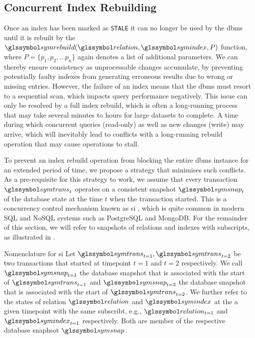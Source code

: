 \subsection{Concurrent Index Rebuilding}

Once an index has been marked as \texttt{STALE} it can no longer be used by the \acrshort{dbms} until it is rebuilt by the $\symrebuild(\relation,\symindex,P)$ function, where $P = \{ p_1, p_2, \ldots p_n \}$ again denotes a list of additional parameters. We can thereby ensure consistency as unprocessable changes accumulate, by preventing potentially faulty indexes from generating erroneous results due to wrong or missing entries. However, the failure of an index means that the \acrshort{dbms} must resort to a sequential scan, which impacts query performance negatively. This issue can only be resolved by a full index rebuild, which is often a long-running process that may take several minutes to hours for large datasets to complete. A time during which concurrent queries (read-only) as well as new changes (write) may arrive, which will inevitably lead to conflicts with a long-running rebuild operation that may cause operations to stall.

To prevent an index rebuild operation from blocking the entire \acrshort{dbms} instance for an extended period of time, we propose a strategy that minimises such conflicts. As a pre-requisite for this strategy to work, we assume that every transaction $\symtrans_t$ operates on a consistent snapshot $\symsnap_t$ of the database state at the time $t$ when the transaction started. This is a concurrency control mechanism known as \acrfull{si} \cite{Berenson:1995Critique}, which is quite common in modern SQL and NoSQL systems such as PostgreSQL and MongoDB. For the remainder of this section, we will refer to snapshots of relations and indexes with subscripts, as illustrated in . 

\begin{example}[label=example:snapshot_isolation]{Nomenclature for \acrlong{si}}{}
    Let $\symtrans_{t=1}, \symtrans_{t=2}$ be two transactions that started at timepoint $t = 1$ and $t = 2$ respectively. We call $\symsnap_{t=1}$ the database snapshot that is associated with the start of $\symtrans_{t=1}$ and $\symsnap_{t=2}$ the database snapshot that is associated with the start of $\symtrans_{t=2}$. We further refer to the states of relation $\relation$ and $\symindex$ at the a given timepoint with the same subscribt, e.g., $\relation_{t=1}$ and $\symindex_{t=1}$ respectively. Both are member of the respective database snaphsot $\symsnap$.
\end{example}

